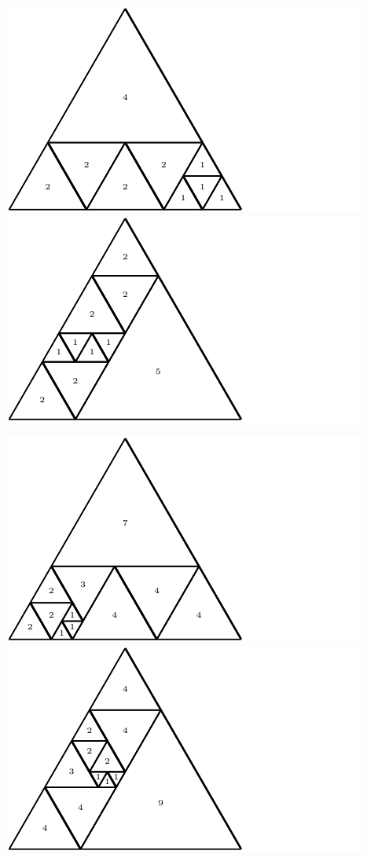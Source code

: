 \documentclass[12pt,amstags,fleqn]{article}
\theoremstyle{plain}
\theoremstyle{definition}
\theoremstyle{definition}
\begin{document}
\begin{center}
\includegraphics{max_relative_size_9.pdf}\includegraphics{max_relative_size_10.pdf}
\end{center}
\begin{center}
\includegraphics{max_relative_size_11.pdf}\includegraphics{max_relative_size_12.pdf}
\end{center}
\end{document}
